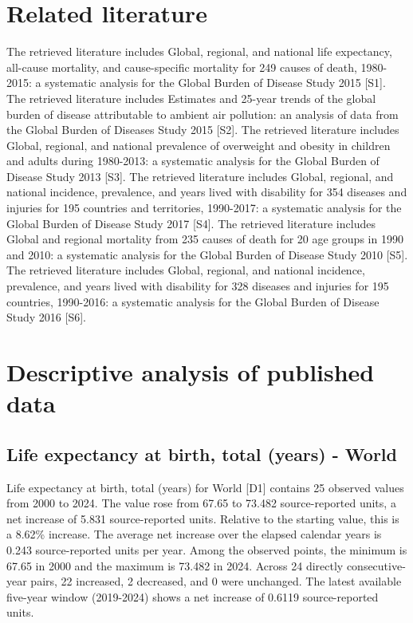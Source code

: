 \documentclass[10pt,a4paper]{article}
\begin{document}
\section{Related literature}
The retrieved literature includes Global, regional, and national life expectancy, all-cause mortality, and cause-specific mortality for 249 causes of death, 1980-2015: a systematic analysis for the Global Burden of Disease Study 2015 [S1]. The retrieved literature includes Estimates and 25-year trends of the global burden of disease attributable to ambient air pollution: an analysis of data from the Global Burden of Diseases Study 2015 [S2]. The retrieved literature includes Global, regional, and national prevalence of overweight and obesity in children and adults during 1980-2013: a systematic analysis for the Global Burden of Disease Study 2013 [S3]. The retrieved literature includes Global, regional, and national incidence, prevalence, and years lived with disability for 354 diseases and injuries for 195 countries and territories, 1990-2017: a systematic analysis for the Global Burden of Disease Study 2017 [S4]. The retrieved literature includes Global and regional mortality from 235 causes of death for 20 age groups in 1990 and 2010: a systematic analysis for the Global Burden of Disease Study 2010 [S5]. The retrieved literature includes Global, regional, and national incidence, prevalence, and years lived with disability for 328 diseases and injuries for 195 countries, 1990-2016: a systematic analysis for the Global Burden of Disease Study 2016 [S6].
\section{Descriptive analysis of published data}
\subsection*{Life expectancy at birth, total (years) - World}
Life expectancy at birth, total (years) for World [D1] contains 25 observed values from 2000 to 2024. The value rose from 67.65 to 73.482 source-reported units, a net increase of 5.831 source-reported units. Relative to the starting value, this is a 8.62\% increase. The average net increase over the elapsed calendar years is 0.243 source-reported units per year. Among the observed points, the minimum is 67.65 in 2000 and the maximum is 73.482 in 2024. Across 24 directly consecutive-year pairs, 22 increased, 2 decreased, and 0 were unchanged. The latest available five-year window (2019-2024) shows a net increase of 0.6119 source-reported units.
\end{document}
